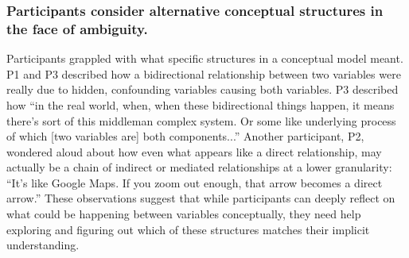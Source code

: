 \subsubsection{Participants consider alternative conceptual structures in the face of ambiguity.}
Participants grappled with what specific structures in a conceptual model meant. P1 and P3
described how a bidirectional relationship between two variables were really due
to hidden, confounding variables causing both variables. P3 described how ``in
the real world, when, when these bidirectional things happen, it means there's
sort of this middleman complex system. Or some like underlying process of which
[two variables are] both components...'' Another participant, P2, wondered aloud
about how even what appears like a direct relationship, may actually be a chain
of indirect or mediated relationships at a lower granularity: ``It's like Google
Maps. If you zoom out enough, that arrow becomes a direct arrow.'' These
observations suggest that while participants can deeply reflect on what could be
happening between variables conceptually, they need help exploring and
figuring out which of these structures matches their implicit understanding.


\begin{comment}
\subsubsection{More expressivity for specifying study designs/experimental design}
**keep short**
Additional observations about expressing study design
More future work for how to express study designs

TODO: Participant as a separate construct
\end{comment}


